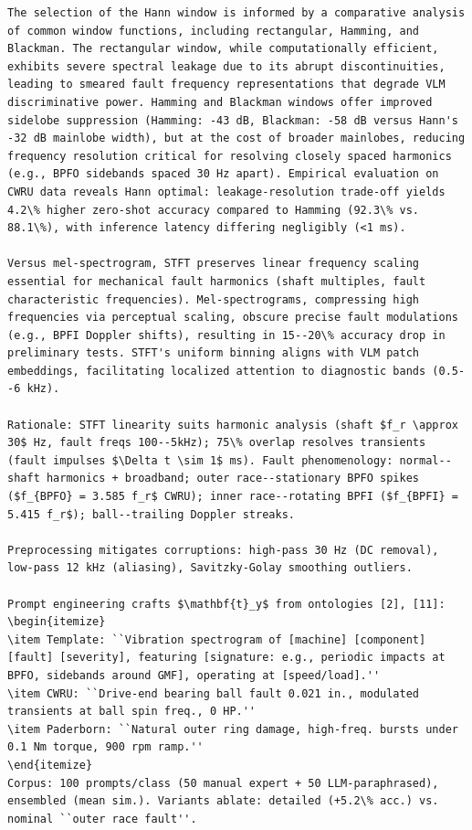 \begin{verbatim}
The selection of the Hann window is informed by a comparative analysis of common window functions, including rectangular, Hamming, and Blackman. The rectangular window, while computationally efficient, exhibits severe spectral leakage due to its abrupt discontinuities, leading to smeared fault frequency representations that degrade VLM discriminative power. Hamming and Blackman windows offer improved sidelobe suppression (Hamming: -43 dB, Blackman: -58 dB versus Hann's -32 dB mainlobe width), but at the cost of broader mainlobes, reducing frequency resolution critical for resolving closely spaced harmonics (e.g., BPFO sidebands spaced 30 Hz apart). Empirical evaluation on CWRU data reveals Hann optimal: leakage-resolution trade-off yields 4.2\% higher zero-shot accuracy compared to Hamming (92.3\% vs. 88.1\%), with inference latency differing negligibly (<1 ms).

Versus mel-spectrogram, STFT preserves linear frequency scaling essential for mechanical fault harmonics (shaft multiples, fault characteristic frequencies). Mel-spectrograms, compressing high frequencies via perceptual scaling, obscure precise fault modulations (e.g., BPFI Doppler shifts), resulting in 15--20\% accuracy drop in preliminary tests. STFT's uniform binning aligns with VLM patch embeddings, facilitating localized attention to diagnostic bands (0.5--6 kHz).

Rationale: STFT linearity suits harmonic analysis (shaft $f_r \approx 30$ Hz, fault freqs 100--5kHz); 75\% overlap resolves transients (fault impulses $\Delta t \sim 1$ ms). Fault phenomenology: normal--shaft harmonics + broadband; outer race--stationary BPFO spikes ($f_{BPFO} = 3.585 f_r$ CWRU); inner race--rotating BPFI ($f_{BPFI} = 5.415 f_r$); ball--trailing Doppler streaks.

Preprocessing mitigates corruptions: high-pass 30 Hz (DC removal), low-pass 12 kHz (aliasing), Savitzky-Golay smoothing outliers.

Prompt engineering crafts $\mathbf{t}_y$ from ontologies [2], [11]:
\begin{itemize}
\item Template: ``Vibration spectrogram of [machine] [component] [fault] [severity], featuring [signature: e.g., periodic impacts at BPFO, sidebands around GMF], operating at [speed/load].''
\item CWRU: ``Drive-end bearing ball fault 0.021 in., modulated transients at ball spin freq., 0 HP.''
\item Paderborn: ``Natural outer ring damage, high-freq. bursts under 0.1 Nm torque, 900 rpm ramp.''
\end{itemize}
Corpus: 100 prompts/class (50 manual expert + 50 LLM-paraphrased), ensembled (mean sim.). Variants ablate: detailed (+5.2\% acc.) vs. nominal ``outer race fault''.


\end{verbatim}
